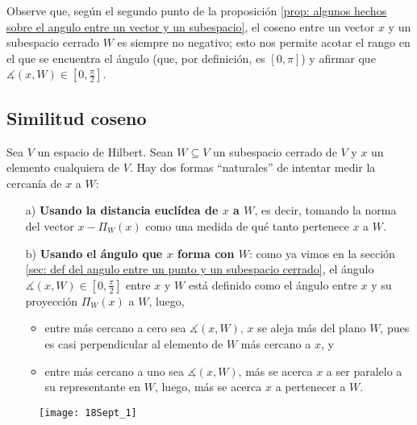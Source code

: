 \QEDB
\vspace{0.2cm}

\begin{nota}
\label{nota: sim coseno entre 0 y pi medios}
Observe que, según el segundo punto de la proposición 
\ref{prop: algunos hechos sobre el angulo entre un vector y un subespacio}, 
el coseno entre un vector $x$ y un subespacio cerrado $W$ es
siempre no negativo; esto nos permite acotar el rango en el que
se encuentra el ángulo (que, por definición, es $[0, \pi]$)
y afirmar que $\measuredangle(x, W) \in [0, \frac{\pi}{2}]$.
\end{nota}

\subsection{Similitud coseno}
\label{cosine similarity}

Sea $V$ un espacio de Hilbert.
Sean $W \subseteq V$ un subespacio cerrado de $V$ y 
$x$ un elemento cualquiera de $V$. Hay dos formas ``naturales''
de intentar medir la cercanía de $x$ a $W$:
\begin{itemize}
\item[a)] \textbf{Usando la distancia euclídea
de $x$ a $W$}, es decir, tomando la norma del vector
$x - \Pi_{W}(x)$ como una medida
de qué tanto pertenece $x$ a $W$.
\item[b)] \textbf{Usando el ángulo que $x$ forma con $W$}: como ya
vimos en la sección 
\ref{sec: def del angulo entre un punto y un subespacio cerrado}, el ángulo 
$\measuredangle (x, W) \in [0, \frac{\pi}{2}]$
entre $x$ y $W$
está definido como el ángulo entre $x$ y su proyección
$\Pi_{W}(x)$ a $W$, luego, 
	\begin{itemize}
		\item entre más cercano a cero sea $\measuredangle (x, W)$,
		$x$ se aleja más del plano $W$, pues es casi perpendicular 
		al elemento de $W$ más cercano a $x$, y
		
		\item entre más cercano a uno sea $\measuredangle (x, W)$,
		más se acerca $x$ a ser paralelo a su representante en $W$,
		luego, más se acerca $x$ a pertenecer a $W$.
	\end{itemize}
\end{itemize}

\begin{figure}[H]
	\centering
	\texttt{[image: 18Sept\_1]} 
\end{figure}	

